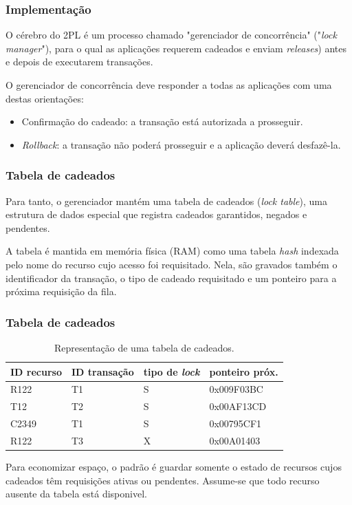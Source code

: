 \documentclass{beamer}
\begin{document}

\begin{frame} %
    \frametitle{Implementação}

    O cérebro do 2PL é um processo chamado "gerenciador de concorrência" ("\emph{lock manager}"), para o qual as aplicações requerem cadeados e enviam \emph{releases}) antes e depois de executarem transações.

    \medskip
    O gerenciador de concorrência deve responder a todas as aplicações com uma destas orientações:

    \begin{itemize}
        \item Confirmação do cadeado: a transação está autorizada a prosseguir.
        \item \emph{Rollback}: a transação não poderá prosseguir e a aplicação deverá desfazê-la.
    \end{itemize}
\end{frame}


\begin{frame} %
    \frametitle{Tabela de cadeados}
    Para tanto, o gerenciador mantém uma tabela de cadeados (\emph{lock table}), uma estrutura de dados especial que registra cadeados garantidos, negados e pendentes.

    \medskip
    A tabela é mantida em memória física (RAM) como uma tabela \emph{hash} indexada pelo nome do recurso cujo acesso foi requisitado. Nela, são gravados também o identificador da transação, o tipo de cadeado requisitado e um ponteiro para a próxima requisição da fila.
\end{frame}


\begin{frame} %
    \frametitle{Tabela de cadeados}

    \begin{table}
    \begin{tabular}{l l l l}
        \toprule

        \textbf{ID recurso} & \textbf{ID transação} & \textbf{tipo de \emph{lock}} & \textbf{ponteiro próx.}\\

        \midrule

        R122 & T1 & S & 0x009F03BC \\
        T12 & T2 & S & 0x00AF13CD \\
        C2349 & T1 & S & 0x00795CF1 \\
        R122 & T3 & X & 0x00A01403 \\

        \bottomrule
    \end{tabular}
    \caption{Representação de uma tabela de cadeados.}
    \end{table}

    \medskip
    Para economizar espaço, o padrão é guardar somente o estado de recursos cujos cadeados têm requisições ativas ou pendentes. Assume-se que todo recurso ausente da tabela está disponivel.
\end{frame}
    
\end{document}
